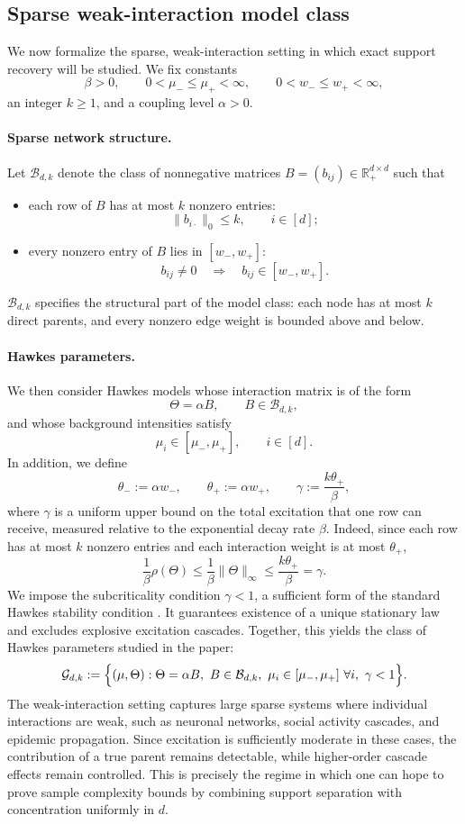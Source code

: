 \documentclass{article}
\newcommand{\thetalo}{\theta_-}
\newcommand{\thetahi}{\theta_+}
\newcommand{\R}{\mathbb{R}}
\begin{document}
\subsection{Sparse weak-interaction model class}

We now formalize the sparse, weak-interaction setting in which exact support recovery will be studied. We fix constants
\[
\beta >0, \qquad 0<\mu_-\le \mu_+<\infty,
\qquad
0<w_-\le w_+<\infty,
\]
an integer $k\ge 1$, and a coupling level $\alpha>0$. 

\paragraph{Sparse network structure.} Let $\mathcal B_{d,k}$ denote the class of nonnegative matrices $B=(b_{ij})\in\R_+^{d\times d}$ such that
\begin{itemize}
\item each row of $B$ has at most $k$ nonzero entries:
\[
\|b_{i\cdot}\|_0\le k,
\qquad i\in[d];
\]
\item every nonzero entry of $B$ lies in $[w_-,w_+]$:
\[
b_{ij}\neq 0
\quad\Longrightarrow\quad
b_{ij}\in[w_-,w_+].
\]
\end{itemize}

$\mathcal B_{d,k}$ specifies the structural part of the model class: each node has at most $k$ direct parents, and every nonzero edge weight is bounded above and below. 

\paragraph{Hawkes parameters.} We then consider Hawkes models whose interaction matrix is of the form
\[
\Theta=\alpha B,
\qquad
B\in\mathcal B_{d,k},
\]
and whose background intensities satisfy
\[
\mu_i\in[\mu_-,\mu_+],
\qquad i\in[d].
\]
In addition, we define 
\[
\thetalo := \alpha w_-,
\qquad
\thetahi := \alpha w_+,
\qquad
\gamma := \frac{k\thetahi}{\beta},
\]
where \(\gamma\) is a uniform upper bound on the total excitation that
one row can receive, measured relative to the exponential decay rate \(\beta\).
Indeed, since each row has at most \(k\) nonzero entries and each interaction weight is at most \(\thetahi\),
\[
\frac{1}{\beta}\rho(\Theta)
\le
\frac{1}{\beta}\|\Theta\|_\infty
\le
\frac{k\thetahi}{\beta}
=
\gamma .
\]
We impose the subcriticality condition \(\gamma<1\), a sufficient form of the standard Hawkes stability condition \cite{hawkes1971spectra}. It guarantees existence of a unique stationary law and excludes explosive excitation cascades.
Together, this yields the class of Hawkes parameters studied in the paper:
\[
\mathcal G_{d,k}
:=
\Bigl\{
(\mu,\Theta):
\Theta=\alpha B,\ B\in\mathcal B_{d,k},\ \mu_i\in[\mu_-,\mu_+]\ \forall i,\ \gamma<1
\Bigr\}.
\]
The weak-interaction setting captures large sparse systems where individual interactions are weak, such as neuronal networks, social activity cascades, and epidemic propagation. Since excitation is sufficiently moderate in these cases, the contribution of a true parent remains detectable, while higher-order cascade effects remain controlled. This is precisely the regime in which one can hope to prove sample complexity bounds by combining support separation with concentration uniformly in $d$.
\end{document}
